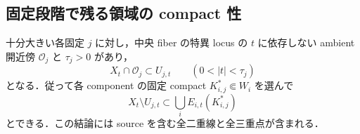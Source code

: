 \subsection{固定段階で残る領域の compact 性}

\begin{lemma}
\label{ke:fixed-stage-stratum-coverage}
十分大きい各固定 $j$ に対し，中央 fiber の特異 locus の $t$ に依存しない ambient
開近傍 $\mathcal O_j$ と $\tau_j>0$ があり，
\[
 X_t\cap\mathcal O_j\subset U_{j,t}
 \qquad(0<|t|<\tau_j)
\]
となる．従って各 component の固定 compact $K^*_{i,j}\Subset W_i$ を選んで
\begin{equation}\label{ke:eq:fixed-stage-compact-complement}
 X_t\setminus U_{j,t}\subset\bigcup_i E_{i,t}(K^*_{i,j})
\end{equation}
とできる．この結論には source を含む全二重線と全三重点が含まれる．
\end{lemma}

